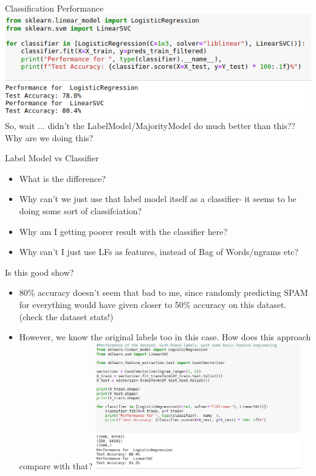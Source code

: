 \documentclass{beamer}
\begin{document}
\begin{frame}{Classification Performance}
        \includegraphics[width=\textwidth]{figures/snorkelspamclassifier.png}
        So, wait ... didn't the LabelModel/MajorityModel do much better than this?? Why are we doing this? 
\end{frame}

\begin{frame}{Label Model vs Classifier}
    \begin{itemize}
        \item What is the difference?
        \item Why can't we just use that label model itself as a classifier- it seems to be doing some sort of classifciation?
        \item Why am I getting poorer result with the classifier here?
        \item Why can't I just use LFs as features, instead of Bag of Words/ngrams etc?
    \end{itemize}
\end{frame}

\begin{frame}{Is this good show?}
\begin{itemize}
    \item 80\% accuracy doesn't seem that bad to me, since randomly predicting SPAM for everything would have given closer to 50\% accuracy on this dataset. (check the dataset stats!)
    \item However, we know the original labels too in this case. How does this approach compare with that? \pause
            \includegraphics[width=0.7\textwidth]{figures/originalclassifier.png}
\end{itemize}
\end{frame}
\end{document}
